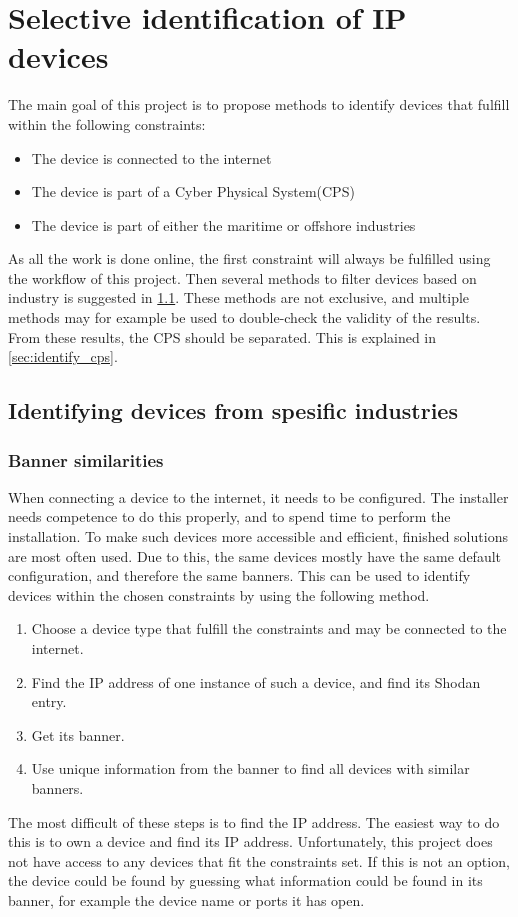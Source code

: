 \section{Selective identification of IP devices} \label{sec:method}
The main goal of this project is to propose methods to identify devices that fulfill within the following constraints:
\begin{itemize}
    \item The device is connected to the internet 
    \item The device is part of a Cyber Physical System(CPS)
    \item The device is part of either the maritime or offshore industries
\end{itemize}
As all the work is done online, the first constraint will always be fulfilled using the workflow of this project. 
Then several methods to filter devices based on industry is suggested in \cref{sec:identify_industry}. These methods are not exclusive, and multiple methods may for example be used to double-check the validity of the results.
From these results, the CPS should be separated. This is explained in \cref{sec:identify_cps}.

\subsection{Identifying devices from spesific industries} \label{sec:identify_industry}
\subsubsection{Banner similarities} \label{sec:banner_method}
When connecting a device to the internet, it needs to be configured. The installer needs competence to do this properly, and to spend time to perform the installation. To make such devices more accessible and efficient, finished solutions are most often used. Due to this, the same devices mostly have the same default configuration, and therefore the same banners. This can be used to identify devices within the chosen constraints by using the following method.
\begin{enumerate}
    \item Choose a device type that fulfill the constraints and may be connected to the internet.
    \item Find the IP address of one instance of such a device, and find its Shodan entry.
    \item Get its banner.
    \item Use unique information from the banner to find all devices with similar banners.
\end{enumerate}
The most difficult of these steps is to find the IP address. The easiest way to do this is to own a device and find its IP address. Unfortunately, this project does not have access to any devices that fit the constraints set.
If this is not an option, the device could be found by guessing what information could be found in its banner, for example the device name or ports it has open.


